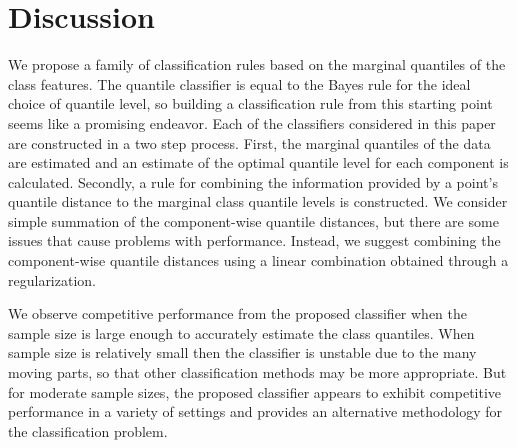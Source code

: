 
\section{Discussion}
\label{sec:discussion}

We propose a family of classification rules based on the marginal quantiles of
the class features.  The quantile classifier is equal to the Bayes rule for the
ideal choice of quantile level, so building a classification rule from this
starting point seems like a promising endeavor.  Each of the classifiers
considered in this paper are constructed in a two step process.  First, the
marginal quantiles of the data are estimated and an estimate of the optimal
quantile level for each component is calculated.  Secondly, a rule for combining
the information provided by a point's quantile distance to the marginal class
quantile levels is constructed.  We consider simple summation of the
component-wise quantile distances, but there are some issues that cause problems
with performance.  Instead, we suggest combining the component-wise quantile
distances using a linear combination obtained through a regularization.

We observe competitive performance from the proposed classifier when the sample
size is large enough to accurately estimate the class quantiles.  When sample
size is relatively small then the classifier is unstable due to the many moving
parts, so that other classification methods may be more appropriate.  But for
moderate sample sizes, the proposed classifier appears to exhibit competitive
performance in a variety of settings and provides an alternative methodology for
the classification problem.




